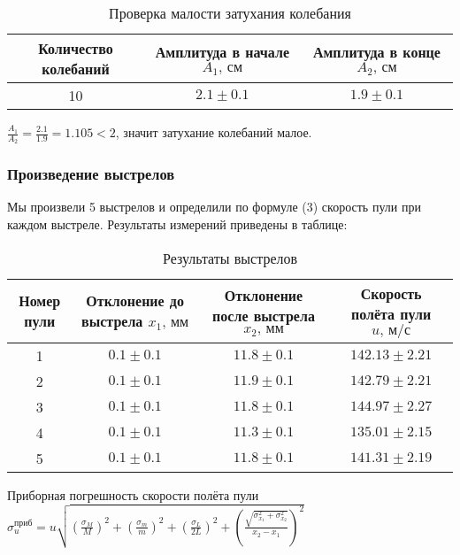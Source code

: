 \documentclass[a4paper]{article}
\begin{document}
\begin{table}[h!]
\centering
\caption{Проверка малости затухания колебания}
\begin{tabular}{|c|c|c|}
\hline
Количество колебаний & Амплитуда в начале $A_1\text{, см}$  & Амплитуда в конце $A_2\text{, см}$ \\ \hline
10  & $2.1\pm {0.1}$ & $1.9\pm {0.1}$ \\ \hline

\end{tabular}
\end{table}

\item $\frac{A_1}{A_2} = \frac{2.1}{1.9} = 1.105 < 2$, значит затухание колебаний малое.

\subsubsection{Произведение выстрелов}

Мы произвели 5 выстрелов и определили по формуле (3) скорость пули при каждом выстреле. Результаты измерений приведены в таблице:

\newpage

\begin{table}[h!]
\centering
\caption{Результаты выстрелов}
\begin{tabular}{|c|c|c|c|}
\hline
Номер пули & Отклонение до выстрела  $x_1\text{, мм}$ & Отклонение после выстрела  $x_2\text{, мм}$ & Скорость полёта пули $u\text{, м/с}$\\ \hline
1  & $0.1\pm {0.1}$ & $11.8\pm {0.1}$ & $142.13\pm {2.21}$ \\ \hline
2  & $0.1\pm {0.1}$ & $11.9\pm {0.1}$ & $142.79\pm {2.21}$ \\ \hline
3  & $0.1\pm {0.1}$ & $11.8\pm {0.1}$ & $144.97\pm {2.27}$ \\ \hline
4  & $0.1\pm {0.1}$ & $11.3\pm {0.1}$ & $135.01\pm {2.15}$ \\ \hline
5  & $0.1\pm {0.1}$ & $11.8\pm {0.1}$ & $141.31\pm {2.19}$ \\ \hline

\end{tabular}
\end{table}

\item Приборная погрешность скорости полёта пули $\sigma_u^{\text{приб}} = u \sqrt{(\frac{\sigma_M}{M})^2 + (\frac{\sigma_m}{m})^2 + (\frac{\sigma_L}{2L})^2 + (\frac{\sqrt{\sigma_{x_1}^2 + \sigma_{x_2}^2}}{x_2 - x_1})^2}$
\end{document}
